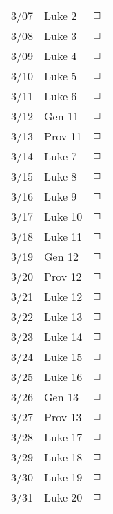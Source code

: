 \documentclass[10pt,landscape,letterpaper]{article}
\begin{document}
\begin{multicols}{5}
\begin{tabular}{p{0.5in}p{0.65in}p{0.3in}}
3/07 & Luke 2 & $\boxempty$ \\
3/08 & Luke 3 & $\boxempty$ \\
3/09 & Luke 4 & $\boxempty$ \\
3/10 & Luke 5 & $\boxempty$ \\
3/11 & Luke 6 & $\boxempty$ \\
\textcolor[rgb]{1.00,0.00,0.00}{3/12} & \textcolor[rgb]{1.00,0.00,0.00}{Gen 11} & $\boxempty$ \\
\textcolor[rgb]{1.00,0.00,0.00}{3/13} & \textcolor[rgb]{1.00,0.00,0.00}{Prov 11} & $\boxempty$ \\

3/14 & Luke 7 & $\boxempty$ \\
3/15 & Luke 8 & $\boxempty$ \\
3/16 & Luke 9 & $\boxempty$ \\
3/17 & Luke 10 & $\boxempty$ \\
3/18 & Luke 11 & $\boxempty$ \\
\textcolor[rgb]{1.00,0.00,0.00}{3/19} & \textcolor[rgb]{1.00,0.00,0.00}{Gen 12} & $\boxempty$ \\
\textcolor[rgb]{1.00,0.00,0.00}{3/20} & \textcolor[rgb]{1.00,0.00,0.00}{Prov 12} & $\boxempty$ \\

3/21 & Luke 12 & $\boxempty$ \\
3/22 & Luke 13 & $\boxempty$ \\
3/23 & Luke 14 & $\boxempty$ \\
3/24 & Luke 15 & $\boxempty$ \\
3/25 & Luke 16 & $\boxempty$ \\
\textcolor[rgb]{1.00,0.00,0.00}{3/26} & \textcolor[rgb]{1.00,0.00,0.00}{Gen 13} & $\boxempty$ \\
\textcolor[rgb]{1.00,0.00,0.00}{3/27} & \textcolor[rgb]{1.00,0.00,0.00}{Prov 13} & $\boxempty$ \\

3/28 & Luke 17 & $\boxempty$ \\
3/29 & Luke 18 & $\boxempty$ \\
3/30 & Luke 19 & $\boxempty$ \\
3/31 & Luke 20 & $\boxempty$ \\

\end{tabular}






\end{multicols}
\end{document}
